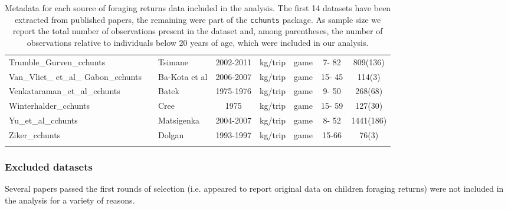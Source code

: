 \begin{landscape}
\begin{longtable}{M{2.6cm} M{3.6cm} M{1.5cm} c c M{1cm} c c}
Trumble\_Gurven\_cchunts        & \cite{gurven_how_2006}                    & Tsimane         & 2002-2011  & kg/trip   & game               & 7- 82   & 809(136)    \\
Van\_Vliet\_ et\_al\_ Gabon\_cchunts & \cite{van_vliet_hunting_2008}             & Ba-Kota et al   & 2006-2007  & kg/trip   & game               & 15- 45  & 114(3)      \\
Venkataraman\_et\_al\_cchunts    & \cite{endicott_hunting_1979}              & Batek           & 1975-1976  & kg/trip   & game               & 9- 50   & 268(68)     \\
Winterhalder\_cchunts          & \cite{winterhalder_boreal_1983}           & Cree            & 1975       & kg/trip   & game               & 15- 59  & 127(30)     \\
Yu\_et\_al\_cchunts              & \cite{ohl-schacherer_sustainability_2007} & Matsigenka      & 2004-2007  & kg/trip   & game               & 8- 52   & 1441(186)   \\
Ziker\_cchunts                 & \cite{ziker_peoples_2002}                 & Dolgan          & 1993-1997 & kg/trip   & game               & 15-66  & 76(3)     \\ 
\caption{Metadata for each source of foraging returns data included in the analysis. The first 14 datasets have been extracted from published papers, the remaining were part of the \texttt{cchunts} package. As sample size we report the total number of observations present in the dataset and, among parentheses, the number of observations relative to individuals below 20 years of age, which were included in our analysis. }
\label{tab:metadata}
\end{longtable}
\end{landscape}


\subsubsection{Excluded datasets} \label{SI:excluded}

Several papers passed the first rounds of selection (i.e. appeared to report original data on children foraging returns) were not included in the analysis for a variety of reasons. 


